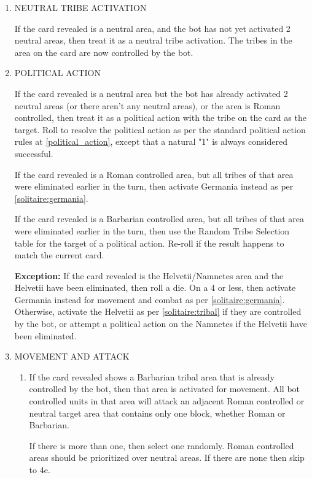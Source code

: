 \renewcommand{\labelenumii}{\alph{enumii}.}
\begin{enumerate}
  \item NEUTRAL TRIBE ACTIVATION

  If the card revealed is a neutral area, and the bot has not yet activated 2 neutral areas, then treat it as a neutral tribe activation. The tribes in the area on the card are now controlled by the bot.

  \item POLITICAL ACTION
  
  If the card revealed is a neutral area but the bot has already activated 2 neutral areas (or there aren't any neutral areas), or the area is Roman controlled, then treat it as a political action with the tribe on the card as the target. Roll to resolve the political action as per the standard political action rules at \ref{political_action}, except that a natural "1" is always considered successful.
  
  If the card revealed is a Roman controlled area, but all tribes of that area were eliminated earlier in the turn, then activate Germania instead as per \ref{solitaire:germania}.
  
  If the card revealed is a Barbarian controlled area, but all tribes of that area were eliminated earlier in the turn, then use the Random Tribe Selection table for the target of a political action. Re-roll if the result happens to match the current card.
  
  \textbf{Exception:} If the card revealed is the Helvetii/Namnetes area and the Helvetii have been eliminated, then roll a die. On a 4 or less, then activate Germania instead for movement and combat as per \ref{solitaire:germania}. Otherwise, activate the Helvetii as per \ref{solitaire:tribal} if they are controlled by the bot, or attempt a political action on the Namnetes if the Helvetii have been eliminated.

  \item MOVEMENT AND ATTACK

  \begin{enumerate}[leftmargin=0in]
    \item \label{solitaire:tribal} If the card revealed shows a Barbarian tribal area that is already controlled by the bot, then that area is activated for movement. All bot controlled units in that area will attack an adjacent Roman controlled or neutral target area that contains only one block, whether Roman or Barbarian.
    
    If there is more than one, then select one randomly. Roman controlled areas should be prioritized over neutral areas. If there are none then skip to 4e.
    

\end{enumerate}
\end{enumerate}
